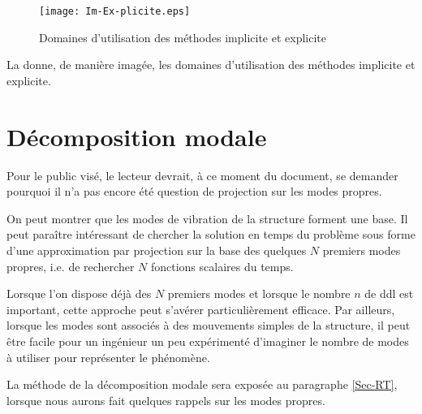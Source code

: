 \medskip
\begin{figure}[ht]
\centering\texttt{[image: Im-Ex-plicite.eps]}
\caption{Domaines d'utilisation des méthodes implicite et explicite}\label{Fig-Im-Ex-plicite}
\end{figure}
La  donne, de manière imagée, les domaines d'utilisation des méthodes implicite et explicite.


\ifVersionAvecExemplesSepares\else
\fi

\bigskip
\section{Décomposition modale}

Pour le public visé, le lecteur devrait, à ce moment du document, se demander pourquoi
il n'a pas encore été question de projection sur les modes propres.

\medskip
On peut montrer que les modes de vibration de la structure forment une base. Il peut
paraître intéressant de chercher la solution en temps du problème sous forme d'une
approximation par projection sur la base des quelques $N$ premiers modes propres, i.e.
de rechercher $N$ fonctions scalaires du temps.

Lorsque l'on dispose déjà des $N$ premiers modes et lorsque le nombre $n$ de ddl est important,
cette approche peut s'avérer particulièrement efficace.
Par ailleurs, lorsque les modes sont associés à des mouvements simples de la structure, il
peut être facile pour un ingénieur un peu expérimenté d'imaginer le nombre de modes à
utiliser pour représenter le phénomène.

\medskip
La méthode de la décomposition modale sera exposée au paragraphe \ref{Sec-RT}, lorsque
nous aurons fait quelques rappels sur les modes propres.





